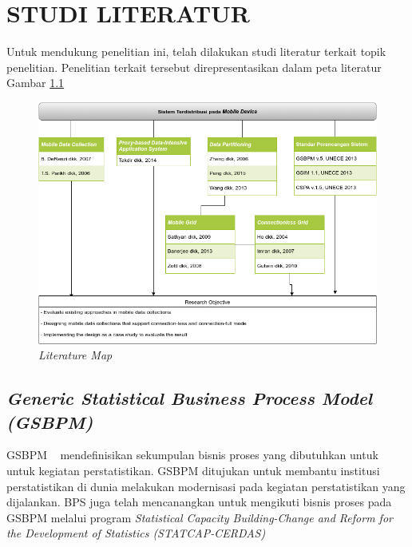 \chapter{STUDI LITERATUR}
Untuk mendukung penelitian ini, telah dilakukan studi literatur terkait topik penelitian. Penelitian terkait tersebut direpresentasikan dalam peta literatur Gambar \ref{fig:literature-map}

\begin{figure}
    \centering
    \includegraphics[width=1\textwidth]{../../Resources/Images/literature-map}
    \caption{\textit{Literature Map}}
    \label{fig:literature-map}
\end{figure}

\section{\textit{Generic Statistical Business Process Model (GSBPM)}}
GSBPM ~\cite{_gsbpm_????} mendefinisikan sekumpulan bisnis proses yang dibutuhkan untuk untuk kegiatan perstatistikan. GSBPM ditujukan untuk membantu institusi perstatistikan di dunia melakukan modernisasi pada kegiatan perstatistikan yang dijalankan. BPS juga telah mencanangkan untuk mengikuti bisnis proses pada GSBPM melalui program \textit{Statistical Capacity Building-Change and Reform for the Development of Statistics (STATCAP-CERDAS)}

